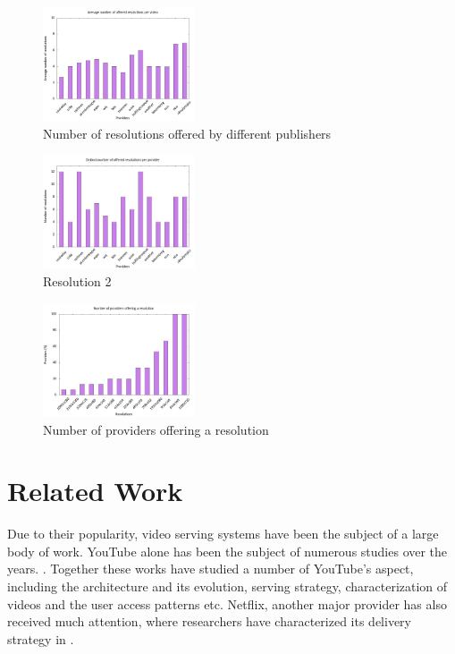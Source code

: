 \documentclass[]{sig-alternate-10pt}
\begin{document}
\begin{figure}
\centering
\includegraphics[width=0.4\textwidth]{resolution_bar_plot1.jpg}
\caption{Number of resolutions offered by different publishers}
\label{fig:resolution1}
\end{figure}
\begin{figure}
\centering
\includegraphics[width=0.4\textwidth]{resolution_bar_plot2.jpg}
\caption{Resolution 2}
\label{fig:resolution2}
\end{figure}
\begin{figure}
\centering
\includegraphics[width=0.4\textwidth]{resolution_bar_plot33.jpg}
\caption{Number of providers offering a resolution}
\label{fig:resolution3}
\end{figure}

\hypertarget{related-work}{%
\section{Related Work}\label{related-work}}

Due to their popularity, video serving systems have been the subject of
a large body of work. YouTube alone has been the subject of numerous
studies over the years.
\autocites{Adhikari10}{mattgoogle}{Gill07}{Zink09}{Cha07}{sanjay11}{Torres11}{upload}{prefixcounting}.
Together these works have studied a number of YouTube's aspect,
including the architecture and its evolution, serving strategy,
characterization of videos and the user access patterns etc. Netflix,
another major provider has also received much attention, where
researchers have characterized its delivery strategy in
\autocites{netflix}{BB}.
\end{document}

